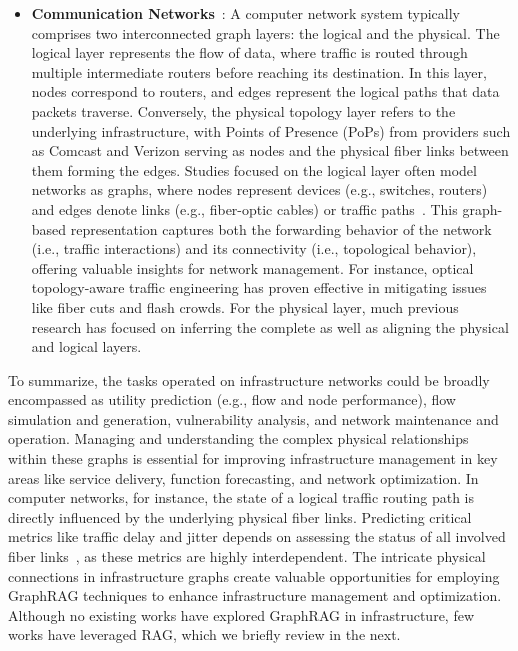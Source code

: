 \begin{itemize}[leftmargin=*]
    \item \textbf{Communication Networks}~\cite{ferriol2023routenet, rusek2020routenet}: A computer network system typically comprises two interconnected graph layers: the logical and the physical. The logical layer represents the flow of data, where traffic is routed through multiple intermediate routers before reaching its destination. In this layer, nodes correspond to routers, and edges represent the logical paths that data packets traverse. Conversely, the physical topology layer refers to the underlying infrastructure, with Points of Presence (PoPs) from providers such as Comcast and Verizon serving as nodes and the physical fiber links between them forming the edges. Studies focused on the logical layer often model networks as graphs, where nodes represent devices (e.g., switches, routers) and edges denote links (e.g., fiber-optic cables) or traffic paths~\cite{ji2020traffic}. This graph-based representation captures both the forwarding behavior of the network (i.e., traffic interactions) and its connectivity (i.e., topological behavior), offering valuable insights for network management. For instance, optical topology-aware traffic engineering has proven effective in mitigating issues like fiber cuts and flash crowds. For the physical layer, much previous research has focused on inferring the complete as well as aligning the physical and logical layers.
\end{itemize}

To summarize, the tasks operated on infrastructure networks could be broadly encompassed as utility prediction (e.g., flow and node performance), flow simulation and generation, vulnerability analysis, and network maintenance and operation. Managing and understanding the complex physical relationships within these graphs is essential for improving infrastructure management in key areas like service delivery, function forecasting, and network optimization. In computer networks, for instance, the state of a logical traffic routing path is directly influenced by the underlying physical fiber links. Predicting critical metrics like traffic delay and jitter depends on assessing the status of all involved fiber links~\cite{ferriol2023routenet, rusek2020routenet}, as these metrics are highly interdependent. The intricate physical connections in infrastructure graphs create valuable opportunities for employing GraphRAG techniques to enhance infrastructure management and optimization. Although no existing works have explored GraphRAG in infrastructure, few works have leveraged RAG, which we briefly review in the next.

